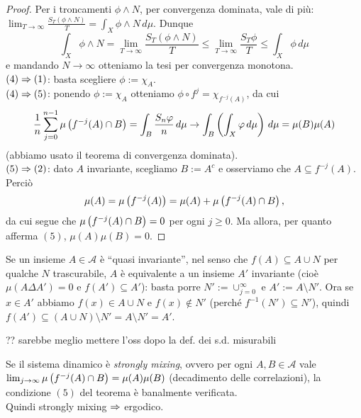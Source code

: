 \begin{proof}
Per i troncamenti $\phi\wedge N$, per convergenza dominata, vale di più: $\lim_{T\to\infty}\frac{S_T(\phi\wedge N)}{T}=\int_X \phi\wedge N\,d\mu$. Dunque
\[ \int_X\phi\wedge N=\lim_{T\to\infty}\frac{S_T(\phi\wedge N)}{T}\le\lim_{T\to\infty}\frac{S_T\phi}{T}\le \int_X\phi\,d\mu \]
e mandando $N\to\infty$ otteniamo la tesi per convergenza monotona. \\
$(4)\Rightarrow (1)$: basta scegliere $\phi:=\chi_A$. \\
$(4)\Rightarrow(5)$: ponendo $\phi:=\chi_A$ otteniamo $\phi\circ f^j=\chi_{f^{-j}(A)}$, da cui
\[ \frac{1}{n}\sum_{j=0}^{n-1}\mu\left(f^{-j}(A)\cap B\right)=\int_B\frac{S_n\varphi}{n}\,d\mu\to\int_B\left(\int_X\varphi\,d\mu\right)\,d\mu=\mu(B)\mu(A) \]
(abbiamo usato il teorema di convergenza dominata). \\
$(5)\Rightarrow (2)$: dato $A$ invariante, scegliamo $B:=A^c$ e osserviamo che $A\subseteq f^{-j}(A)$. Perciò
\[ \mu(A)=\mu\left(f^{-j}(A)\right)=\mu(A)+\mu\left(f^{-j}(A)\cap B\right), \]
da cui segue che $\mu\left(f^{-j}(A)\cap B\right)=0$ per ogni $j\ge 0$. Ma allora, per quanto afferma $(5)$, $\mu(A)\mu(B)=0$.
\end{proof}

\begin{oss}Se un insieme $A\in\mathcal{A}$ è ``quasi invariante'', nel senso che $f(A)\subseteq A\cup N$ per qualche
$N$ trascurabile, $A$ è equivalente a un insieme $A'$ invariante (cioè $\mu(A\Delta A')=0$ e $f(A')\subseteq A'$):
basta porre $N':=\cup_{j=0}^\infty$ e $A':=A\setminus N'$. Ora se $x\in A'$ abbiamo
$f(x)\in A\cup N$ e $f(x)\nin N'$ (perché $f^{-1}(N')\subseteq N'$), quindi $f(A')\subseteq (A\cup N)\setminus N'=A\setminus N'=A'$.
\end{oss}

?? sarebbe meglio mettere l'oss dopo la def. dei s.d. misurabili

\begin{oss}Se il sistema dinamico è \emph{strongly mixing}, ovvero per ogni $A,B\in\mathcal{A}$ vale
$\lim_{j\to\infty}\mu\left(f^{-j}(A)\cap B\right)=\mu(A)\mu(B)$ (\lcap decadimento delle correlazioni\rcap),
la condizione $(5)$ del teorema è banalmente verificata. \\
Quindi strongly mixing $\Rightarrow$ ergodico.
\end{oss}

